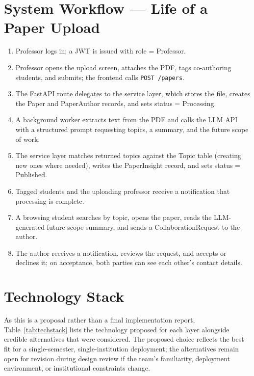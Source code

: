 \documentclass[11pt]{article}
\begin{document}
\section{System Workflow --- Life of a Paper Upload}
\begin{enumerate}[itemsep=2pt]
    \item Professor logs in; a JWT is issued with role = Professor.
    \item Professor opens the upload screen, attaches the PDF, tags co-authoring students, and submits; the frontend calls \texttt{POST /papers}.
    \item The FastAPI route delegates to the service layer, which stores the file, creates the Paper and PaperAuthor records, and sets status = Processing.
    \item A background worker extracts text from the PDF and calls the LLM API with a structured prompt requesting topics, a summary, and the future scope of work.
    \item The service layer matches returned topics against the Topic table (creating new ones where needed), writes the PaperInsight record, and sets status = Published.
    \item Tagged students and the uploading professor receive a notification that processing is complete.
    \item A browsing student searches by topic, opens the paper, reads the LLM-generated future-scope summary, and sends a CollaborationRequest to the author.
    \item The author receives a notification, reviews the request, and accepts or declines it; on acceptance, both parties can see each other's contact details.
\end{enumerate}

\section{Technology Stack}
As this is a proposal rather than a final implementation report, Table~\ref{tab:techstack} lists the technology proposed for each layer alongside credible alternatives that were considered. The proposed choice reflects the best fit for a single-semester, single-institution deployment; the alternatives remain open for revision during design review if the team's familiarity, deployment environment, or institutional constraints change.
\end{document}

